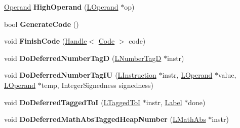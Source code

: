 \begin{DoxyCompactItemize}
\item 
\hyperlink{classv8_1_1internal_1_1_operand}{Operand} {\bfseries High\+Operand} (\hyperlink{classv8_1_1internal_1_1_l_operand}{L\+Operand} $\ast$op)\hypertarget{classv8_1_1internal_1_1_l_code_gen_a79c976de74c8a30744ac70125f9c88f3}{}\label{classv8_1_1internal_1_1_l_code_gen_a79c976de74c8a30744ac70125f9c88f3}

\item 
bool {\bfseries Generate\+Code} ()\hypertarget{classv8_1_1internal_1_1_l_code_gen_aa1307599a440d099f0dbb5dc24f4f59c}{}\label{classv8_1_1internal_1_1_l_code_gen_aa1307599a440d099f0dbb5dc24f4f59c}

\item 
void {\bfseries Finish\+Code} (\hyperlink{classv8_1_1internal_1_1_handle}{Handle}$<$ \hyperlink{classv8_1_1internal_1_1_code}{Code} $>$ code)\hypertarget{classv8_1_1internal_1_1_l_code_gen_a5278837d092b8413daa548719c34864c}{}\label{classv8_1_1internal_1_1_l_code_gen_a5278837d092b8413daa548719c34864c}

\item 
void {\bfseries Do\+Deferred\+Number\+TagD} (\hyperlink{classv8_1_1internal_1_1_l_number_tag_d}{L\+Number\+TagD} $\ast$instr)\hypertarget{classv8_1_1internal_1_1_l_code_gen_af3b589c0911c5e01a018ecee64b7e926}{}\label{classv8_1_1internal_1_1_l_code_gen_af3b589c0911c5e01a018ecee64b7e926}

\item 
void {\bfseries Do\+Deferred\+Number\+Tag\+IU} (\hyperlink{classv8_1_1internal_1_1_l_instruction}{L\+Instruction} $\ast$instr, \hyperlink{classv8_1_1internal_1_1_l_operand}{L\+Operand} $\ast$value, \hyperlink{classv8_1_1internal_1_1_l_operand}{L\+Operand} $\ast$temp, Integer\+Signedness signedness)\hypertarget{classv8_1_1internal_1_1_l_code_gen_aa8bd5ec8f4680ebda1be2da8478394d5}{}\label{classv8_1_1internal_1_1_l_code_gen_aa8bd5ec8f4680ebda1be2da8478394d5}

\item 
void {\bfseries Do\+Deferred\+Tagged\+ToI} (\hyperlink{classv8_1_1internal_1_1_l_tagged_to_i}{L\+Tagged\+ToI} $\ast$instr, \hyperlink{classv8_1_1internal_1_1_label}{Label} $\ast$done)\hypertarget{classv8_1_1internal_1_1_l_code_gen_aaa65e08043bc6272e8615222cb34e25f}{}\label{classv8_1_1internal_1_1_l_code_gen_aaa65e08043bc6272e8615222cb34e25f}

\item 
void {\bfseries Do\+Deferred\+Math\+Abs\+Tagged\+Heap\+Number} (\hyperlink{classv8_1_1internal_1_1_l_math_abs}{L\+Math\+Abs} $\ast$instr)\hypertarget{classv8_1_1internal_1_1_l_code_gen_aa6e5b6dba176a4572ce81dcc27b057aa}{}\label{classv8_1_1internal_1_1_l_code_gen_aa6e5b6dba176a4572ce81dcc27b057aa}


\end{DoxyCompactItemize}
